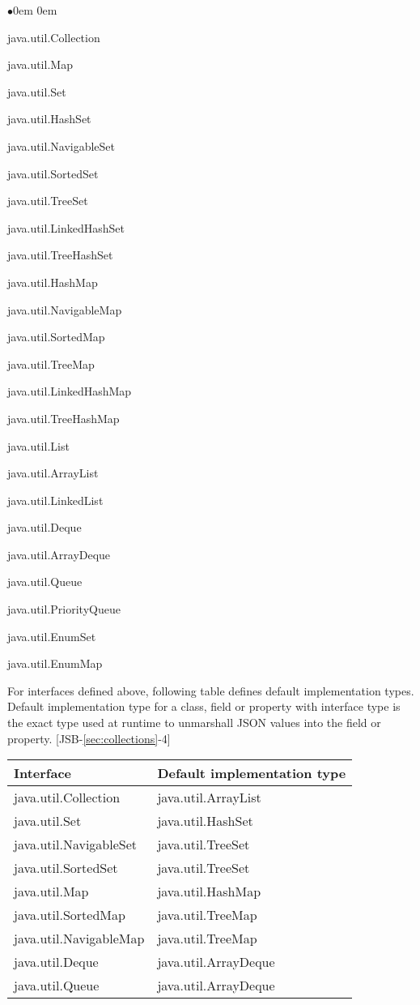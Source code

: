 \begin{list}{$\bullet$}{\parsep 0em  0em}
\item java.util.Collection
\item java.util.Map
\item java.util.Set
\item java.util.HashSet
\item java.util.NavigableSet
\item java.util.SortedSet
\item java.util.TreeSet
\item java.util.LinkedHashSet
\item java.util.TreeHashSet
\item java.util.HashMap
\item java.util.NavigableMap
\item java.util.SortedMap
\item java.util.TreeMap
\item java.util.LinkedHashMap
\item java.util.TreeHashMap
\item java.util.List
\item java.util.ArrayList
\item java.util.LinkedList
\item java.util.Deque
\item java.util.ArrayDeque
\item java.util.Queue
\item java.util.PriorityQueue
\item java.util.EnumSet
\item java.util.EnumMap
\end{list}
For interfaces defined above, following table defines default implementation types. Default implementation type for a class, field or property with interface type is the exact type used at runtime to unmarshall JSON values into the field or property. [JSB-\ref{sec:collections}-4]

\begin{tabularx}{\textwidth}{ |X|X| }
\hline
Interface & Default implementation type \\ 
\hline
java.util.Collection & java.util.ArrayList \\
java.util.Set & java.util.HashSet \\
java.util.NavigableSet & java.util.TreeSet \\
java.util.SortedSet & java.util.TreeSet \\
java.util.Map & java.util.HashMap \\
java.util.SortedMap & java.util.TreeMap \\
java.util.NavigableMap & java.util.TreeMap \\
java.util.Deque & java.util.ArrayDeque \\
java.util.Queue & java.util.ArrayDeque \\
\hline
\end{tabularx}

